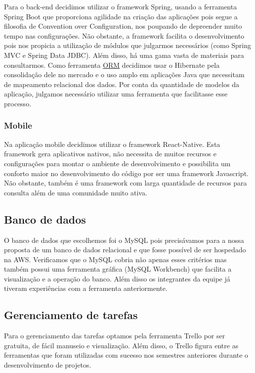 Para o back-end decidimos utilizar o framework Spring, usando a ferramenta Spring Boot que proporciona agilidade na criação das aplicações pois segue a filosofia de Convention over Configuration\cite{Devopedia2020}, nos poupando de depreender muito tempo nas configurações. Não obstante, a framework facilita o desenvolvimento pois nos propicia a utilização de módulos que julgarmos necessários (como Spring MVC e Spring Data JDBC). Além disso, há uma gama vasta de materiais para consultarmos.
Como ferramenta \label{sig:ORM}\hyperlink{s:ORM}{ORM} decidimos usar o Hibernate pela consolidação dele no mercado e o uso amplo em aplicações Java que necessitam de mapeamento relacional dos dados. Por conta da quantidade de modelos da aplicação, julgamos necessário utilizar uma ferramenta que facilitasse esse processo. 

\subsubsection{Mobile}
Na aplicação mobile decidimos utilizar o framework React-Native. Esta framework gera aplicativos nativos, não necessita de muitos recursos e configurações para montar o ambiente de desenvolvimento e possibilita um conforto maior no desenvolvimento do código por ser uma framework Javascript. Não obstante, também é uma framework com larga quantidade de recursos para consulta além de uma comunidade muito ativa.

\subsection{Banco de dados}
O banco de dados que escolhemos foi o MySQL pois precisávamos para a nossa proposta de um banco de dados relacional e que fosse possível de ser hospedado na AWS. Verificamos que o MySQL cobria não apenas esses critérios mas também possui uma ferramenta gráfica (MySQL Workbench) que facilita a visualização e a operação do banco. Além disso os integrantes da equipe já tiveram experiências com a ferramenta anteriormente.

\subsection{Gerenciamento de tarefas}
Para o gerenciamento das tarefas optamos pela ferramenta Trello por ser gratuita, de fácil manuseio e visualização.
Além disso, o Trello figura entre as ferramentas que foram utilizadas com sucesso nos semestres anteriores durante o desenvolvimento de projetos.



